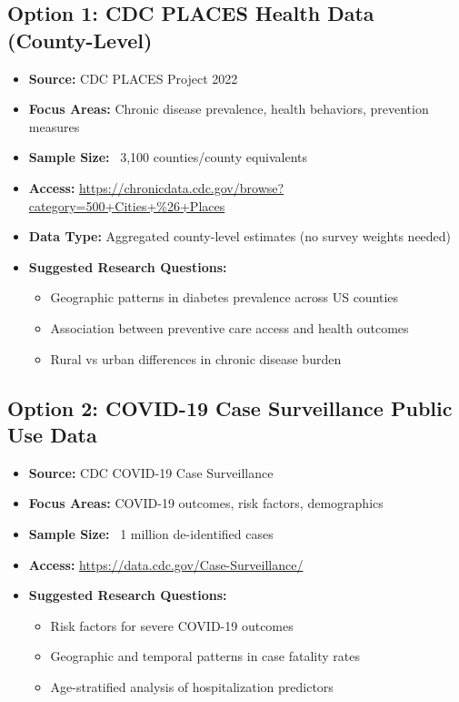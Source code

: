 \documentclass[11pt]{article}
\begin{document}
\subsection{Option 1: CDC PLACES Health Data (County-Level)}
\begin{itemize}
\item \textbf{Source:} CDC PLACES Project 2022
\item \textbf{Focus Areas:} Chronic disease prevalence, health behaviors, prevention measures
\item \textbf{Sample Size:} ~3,100 counties/county equivalents
\item \textbf{Access:} \url{https://chronicdata.cdc.gov/browse?category=500+Cities+%26+Places}
\item \textbf{Data Type:} Aggregated county-level estimates (no survey weights needed)
\item \textbf{Suggested Research Questions:}
    \begin{itemize}
    \item Geographic patterns in diabetes prevalence across US counties
    \item Association between preventive care access and health outcomes
    \item Rural vs urban differences in chronic disease burden
    \end{itemize}
\end{itemize}

\subsection{Option 2: COVID-19 Case Surveillance Public Use Data}
\begin{itemize}
\item \textbf{Source:} CDC COVID-19 Case Surveillance
\item \textbf{Focus Areas:} COVID-19 outcomes, risk factors, demographics
\item \textbf{Sample Size:} ~1 million de-identified cases
\item \textbf{Access:} \url{https://data.cdc.gov/Case-Surveillance/}
\item \textbf{Suggested Research Questions:}
    \begin{itemize}
    \item Risk factors for severe COVID-19 outcomes
    \item Geographic and temporal patterns in case fatality rates
    \item Age-stratified analysis of hospitalization predictors
    \end{itemize}
\end{itemize}
\end{document}
